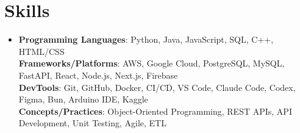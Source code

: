 \documentclass[letterpaper,10pt]{article}
\begin{document}
\section{Skills}
 \begin{itemize}[leftmargin=0.15in, label={}]
    \item{
     \textbf{Programming Languages}{: Python, Java, JavaScript, SQL, C++, HTML/CSS} \\
     \textbf{Frameworks/Platforms}{: AWS, Google Cloud, PostgreSQL, MySQL, FastAPI, React, Node.js, Next.js, Firebase} \\
     \textbf{DevTools}{: Git, GitHub, Docker, CI/CD, VS Code, Claude Code, Codex, Figma, Bun, Arduino IDE, Kaggle} \\
     \textbf{Concepts/Practices}{: Object-Oriented Programming, REST APIs, API Development, Unit Testing, Agile, ETL}
    }
 \end{itemize}
 \vspace{3.53pt}

\end{document}
